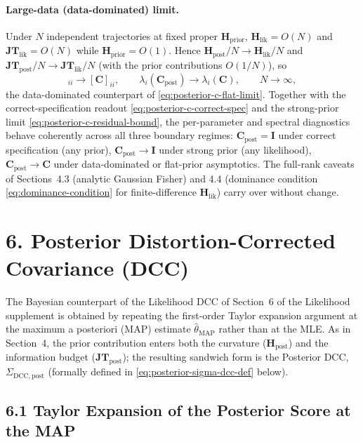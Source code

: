 \documentclass[11pt]{article}
\begin{document}
\paragraph{Large-data (data-dominated) limit.}
Under $N$ independent trajectories at fixed proper $\mathbf H_{\mathrm{prior}}$, $\mathbf H_{\mathrm{lik}} = O(N)$ and $\mathbf{JT}_{\mathrm{lik}} = O(N)$ while $\mathbf H_{\mathrm{prior}} = O(1)$. Hence $\mathbf H_{\mathrm{post}}/N \to \mathbf H_{\mathrm{lik}}/N$ and $\mathbf{JT}_{\mathrm{post}}/N \to \mathbf{JT}_{\mathrm{lik}}/N$ (with the prior contributions $O(1/N)$), so
\begin{equation}
[\mathbf C_{\mathrm{post}}]_{ii} \to [\mathbf C]_{ii},
\qquad
\lambda_i(\mathbf C_{\mathrm{post}}) \to \lambda_i(\mathbf C),
\qquad
N \to \infty,
\label{eq:posterior-c-large-n}
\end{equation}
the data-dominated counterpart of \eqref{eq:posterior-c-flat-limit}. Together with the correct-specification readout \eqref{eq:posterior-c-correct-spec} and the strong-prior limit \eqref{eq:posterior-c-residual-bound}, the per-parameter and spectral diagnostics behave coherently across all three boundary regimes: $\mathbf C_{\mathrm{post}} = \mathbf I$ under correct specification (any prior), $\mathbf C_{\mathrm{post}} \to \mathbf I$ under strong prior (any likelihood), $\mathbf C_{\mathrm{post}} \to \mathbf C$ under data-dominated or flat-prior asymptotics. The full-rank caveats of Sections~4.3 (analytic Gaussian Fisher) and 4.4 (dominance condition \eqref{eq:dominance-condition} for finite-difference $\mathbf H_{\mathrm{lik}}$) carry over without change.

\section*{6. Posterior Distortion-Corrected Covariance (DCC)}

The Bayesian counterpart of the Likelihood DCC of Section~6 of the Likelihood supplement is obtained by repeating the first-order Taylor expansion argument at the maximum a posteriori (MAP) estimate $\hat\theta_{\mathrm{MAP}}$ rather than at the MLE. As in Section~4, the prior contribution enters both the curvature ($\mathbf H_{\mathrm{post}}$) and the information budget ($\mathbf{JT}_{\mathrm{post}}$); the resulting sandwich form is the Posterior DCC, $\Sigma_{\mathrm{DCC},\mathrm{post}}$ (formally defined in \eqref{eq:posterior-sigma-dcc-def} below).

\subsection*{6.1 Taylor Expansion of the Posterior Score at the MAP}
\end{document}
